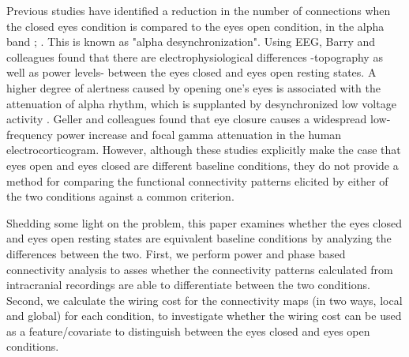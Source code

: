 \documentclass[11pt, onecolumn]{article}
\begin{document}
Previous studies have identified a reduction in the number of connections when the closed eyes condition is compared to the eyes open condition, in the alpha band \citep{tan2013difference}; \citep{barry2007eeg}. This is known as  "alpha desynchronization". Using EEG, Barry and colleagues \citep{barry2007eeg} found that there are electrophysiological differences -topography as well as power levels- between the eyes closed and eyes open resting states.  
A higher degree of alertness caused by opening one's eyes is associated with the attenuation of alpha rhythm, which is supplanted by desynchronized low voltage activity \citep{niedermeyer2005electroencephalography}.
Geller and colleagues \citep{geller2014eye} found that eye closure causes a widespread low-frequency power increase and focal gamma attenuation in the human electrocorticogram. 
However, although these studies explicitly make the case that eyes open and eyes closed are different baseline conditions, they do not provide a method for comparing the functional connectivity patterns elicited by either of the two conditions against a common criterion.

Shedding some light on the problem, this paper examines whether the eyes closed and eyes open resting states are equivalent baseline conditions by analyzing the differences between the two. 
First, we perform power and phase based connectivity analysis to asses whether the connectivity patterns calculated from intracranial recordings  are able to differentiate between the two conditions. Second, we calculate the wiring cost for the connectivity maps (in two ways, local and global) for each condition, to investigate whether the wiring cost can be used as a feature/covariate to distinguish between the eyes closed and eyes open conditions. 
\end{document}
